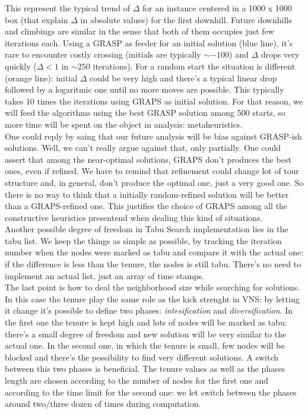 This represent the typical trend of $\Delta$ for an instance centered in a 1000
x 1000 box (that explain $\Delta$ in absolute values) for the first downhill.
Future downhills and climbings are similar in the sense that both of them
occupies just few iterations each. Using a GRASP as feeder for an initial
solution (blue line), it's rare to encounter costly crossing (initials are
typically $\sim-100$) and $\Delta$ drops very quickly ($\Delta < 1$ in $\sim250$
iterations). For a random start the situation is different (orange line):
initial $\Delta$ could be very high and there's a typical linear drop followed
by a logaritmic one until no more moves are possible. This typically takes 10
times the iterations using GRAPS as initial solution. For that reason, we will
feed the algorithms using the best GRASP solution among 500 starts, so more time
will be spent on the object in analysis: metaheuristics.\\ One could reply by
saing that our future analysis will be bias against GRASP-ish solutions. Well,
we can't really argue against that, only partially. One could assert that among
the near-optimal solutions, GRAPS don't produces the best ones, even if refined.
We have to remind that refinement could change lot of tour structure and, in
general, don't produce the optimal one, just a very good one. So there is no way
to think that a initially random-refined solution will be better than a
GRAPS-refined one. This justifies the choice of GRAPS among all the constructive
heuristics presentend when dealing this kind of situations.\\ 
Another possible degree of freedom in Tabu Search implementation lies in the
tabu list. We keep the things as simple as possible, by tracking the iteration
number when the nodes were marked as tabu and compare it with the actual one: if
the difference is less than the tenure, the nodes is still tabu. There's no need
to implement an actual list, just an array of time stamps.\\
The last point is how to deal the neighborhood size while searching for
solutions. In this case the tenure play the same role as the kick strenght in
VNS: by letting it change it's possible to define two phases:
\emph{intesification} and \emph{diversification}. In the first one the tenure is
kept high and lots of nodes will be marked as tabu: there's a small degree of
freedom and new solution will be very similar to the actual one. In the second
one, in which the tenure is small, few nodes will be blocked and there's the
possibility to find very different solutions. A switch between this two phases
is beneficial. The tenure values as well as the phases length are chosen
according to the number of nodes for the first one and according to the time
limit for the second one: we let switch between the phases around two/three
dozen of times during computation.


